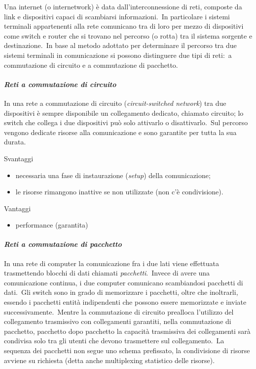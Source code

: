 Una internet (o internetwork) è data dall'interconnessione di reti, composte da link e dispositivi capaci di scambiarsi informazioni.\
In particolare i sistemi terminali appartenenti alla rete comunicano tra di loro per mezzo di dispositivi come switch e router che si trovano nel percorso (o rotta) tra il sistema sorgente e destinazione.\
In base al metodo adottato per determinare il percorso tra due sistemi terminali in comunicazione si possono distinguere due tipi di reti:\ a commutazione di circuito e a commutazione di pacchetto.

\paragraph{\emph{Reti a commutazione di circuito}}

In una rete a commutazione di circuito (\emph{circuit-switched network}) tra due dispositivi è sempre disponibile un collegamento dedicato, chiamato circuito; lo switch che collega i due dispositivi può solo attivarlo o disattivarlo.\
Sul percorso vengono dedicate risorse alla comunicazione e sono garantite per tutta la sua durata.

\vspace{12pt}
\noindent Svantaggi
\begin{itemize}
    \item necessaria una fase di instaurazione (\emph{setup}) della comunicazione;
    \item le risorse rimangono inattive se non utilizzate (non c'è condivisione).
\end{itemize}
Vantaggi
\begin{itemize}
    \item performance (garantita)
\end{itemize}

\paragraph{\emph{Reti a commutazione di pacchetto}}

In una rete di computer la comunicazione fra i due lati viene effettuata trasmettendo blocchi di dati chiamati \emph{pacchetti}.\
Invece di avere una comunicazione continua, i due computer comunicano scambiandosi pacchetti di dati.\
Gli switch sono in grado di memorizzare i pacchetti, oltre che inoltrarli, essendo i pacchetti entità indipendenti che possono essere memorizzate e inviate successivamente.\
Mentre la commutazione di circuito prealloca l'utilizzo del collegamento trasmissivo con collegamenti garantiti, nella commutazione di pacchetto, pacchetto dopo pacchetto la capacità trasmissiva dei collegamenti sarà condivisa solo tra gli utenti che devono trasmettere sul collegamento.\
La sequenza dei pacchetti non segue uno schema prefissato, la condivisione di risorse avviene su richiesta (detta anche multiplexing statistico delle risorse).

